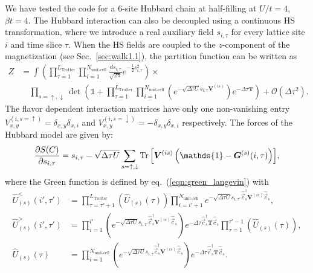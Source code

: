 We have tested the code for a 6-site Hubbard chain at half-filling  at $U/t = 4$,  $\beta t = 4$.
The Hubbard interaction can also be decoupled using a continuous HS transformation, where we introduce a real auxiliary field $s_{i,\tau}$ for every lattice site $i$ and time slice $\tau$. When the HS fields are coupled to the $z$-component of the magnetization (see Sec.~\ref{sec:walk1.1}), the partition function can be written as
\begin{align}
Z &= \int \left( \prod_{\tau=1}^{L_{\text{Trotter}}} \prod_{i=1}^{N_{\text{unit-cell}} } \frac{d s_{i,\tau}}{\sqrt{2 \pi}} e^{-\frac{1}{2} s_{i,\tau}^2 } \right) \times \nonumber \\
 &\quad \prod_{s=\uparrow, \downarrow} \det \left(  \mathds{1} + \prod_{\tau=1}^{L_{\mathrm{Trotter}}}    \prod_{i=1}^{N_{\text{unit-cell}}} \left( e^{-\sqrt{\Delta \tau U}s_{i,\tau} \bm{V}^{(is)}} \right) e^{-\Delta \tau \bm{T}} \right) + \mathcal{O}(\Delta\tau^{2}).
\end{align}
The flavor dependent interaction matrices have only one non-vanishing entry $V_{x,y}^{(i,s=\uparrow)}=\delta_{x,y}\delta_{x,i}$ and $V_{x,y}^{(i,s=\downarrow)}=-\delta_{x,y}\delta_{x,i}$ respectively. 
The forces of the Hubbard model are given by:
\begin{equation}
\frac { \partial S(C)}{\partial s_{i,\tau} } = s_{i,\tau} - \sqrt{\Delta \tau U} \sum\limits_{s=\uparrow, \downarrow} \Tr{\left[ \bm{V}^{(is)}\left(\mathds{1} - \bm{G}^{(s)}(i,\tau) \right) \right]} ,
\end{equation}
where the Green function is defined by eq.~(\ref{eqn:green_langevin}) with
\begin{align}
 \hat{U}_{(s)}^{<}(i',\tau') &= \prod_{\tau=\tau'+1}^{L_{\text{Trotter}}}  \left( \hat{U}_{(s)}(\tau) \right)
\prod_{i=i'+1}^{N_{\text{unit-cell}} } e^{-\sqrt{\Delta\tau U}  s_{i,\tau'} \hat{\vec{c}}_{s}^{\dagger} \bm{V}^{(is)} \hat{\vec{c}}_{s}^{\phantom\dagger}}, \\
 \hat{U}_{(s)}^{>}(i',\tau') &= \prod_{i=1}^{i'}\left( e^{-\sqrt{\Delta\tau U}  s_{i,\tau'} \hat{\vec{c}}_{s}^{\dagger} \bm{V}^{(is)} \hat{\vec{c}}_{s}^{\phantom\dagger}} \right)
    e^{-\Delta\tau  \hat{\vec{c}}_{s}^{\dagger} \bm{T} \hat{\vec{c}}_{s}^{\phantom\dagger}} 
  \prod_{\tau=1}^{\tau'-1}  \left( \hat{U}_{(s)}(\tau) \right), \\
  \hat{U}_{(s)}(\tau) &=  \prod_{i=1}^{N_{\text{unit-cell}} } \left(e^{-\sqrt{\Delta\tau U}  s_{i,\tau} \hat{\vec{c}}_{s}^{\dagger} \bm{V}^{(is)} \hat{\vec{c}}_{s}^{\phantom\dagger}} \right)
   e^{-\Delta\tau  \hat{\vec{c}}_{s}^{\dagger} \bm{T} \hat{\vec{c}}_{s}^{\phantom\dagger}} .
\end{align}
